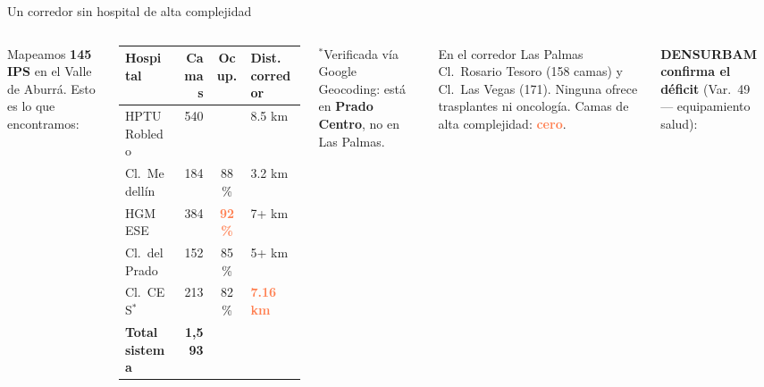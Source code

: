 \documentclass[aspectratio=169, 11pt]{beamer}
\newcommand{\danger}[1]{\textcolor{coral}{\textbf{#1}}}
\newcommand{\src}[1]{\par\vspace{2pt}{\tiny\textcolor{slate}{Fuente: #1}}}
\begin{document}
{
\begin{frame}{Un corredor sin hospital de alta complejidad}

\begin{columns}[T]
{\small Mapeamos \textbf{145 IPS} en el Valle de Aburrá. Esto es lo que encontramos:}

\vspace{4pt}
{\scriptsize
\begin{tabular}{@{}lrcl@{}}
\toprule
\textbf{Hospital} & \textbf{Camas} & \textbf{Ocup.} & \textbf{Dist. corredor} \\
\midrule
\rowcolor{coral!10}
HPTU Robledo & 540 & & 8.5 km \\
Cl.\ Medellín & 184 & 88\% & 3.2 km \\
\rowcolor{coral!6}
HGM ESE & 384 & \danger{92\%} & 7+ km \\
Cl.\ del Prado & 152 & 85\% & 5+ km \\
Cl.\ CES$^*$ & 213 & 82\% & \danger{7.16 km} \\
\midrule
\textbf{Total sistema} & \textbf{1,593} & & \\
\bottomrule
\end{tabular}
}

\vspace{2pt}
{\scriptsize $^*$Verificada vía Google Geocoding: está en \textbf{Prado Centro}, no en Las Palmas.}
\src{REPS MinSalud (b4dp-ximh), Capacidad Instalada (s2ru-bqt6)}

\vspace{3pt}
\begin{block}{\small En el corredor Las Palmas}
\scriptsize
Cl.\ Rosario Tesoro (158 camas) y Cl.\ Las Vegas (171). Ninguna ofrece trasplantes ni oncología. Camas de alta complejidad: \danger{cero}.
\end{block}

{\small\textbf{DENSURBAM confirma el déficit}} {\scriptsize(Var.\ 49 --- equipamiento salud):}

\vspace{2pt}
\begin{center}
\end{center}
\end{columns}
\end{frame}}
\end{document}
